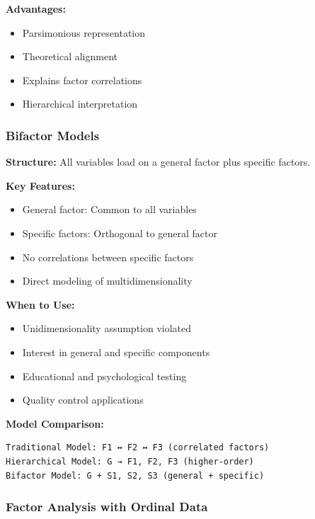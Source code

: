 \documentclass[
]{article}
\begin{document}
\textbf{Advantages:}

\begin{itemize}
\item
  Parsimonious representation
\item
  Theoretical alignment
\item
  Explains factor correlations
\item
  Hierarchical interpretation
\end{itemize}

\subsubsection{Bifactor Models}

\textbf{Structure:} All variables load on a general factor plus specific
factors.

\textbf{Key Features:}

\begin{itemize}
\item
  General factor: Common to all variables
\item
  Specific factors: Orthogonal to general factor
\item
  No correlations between specific factors
\item
  Direct modeling of multidimensionality
\end{itemize}

\textbf{When to Use:}

\begin{itemize}
\item
  Unidimensionality assumption violated
\item
  Interest in general and specific components
\item
  Educational and psychological testing
\item
  Quality control applications
\end{itemize}

\textbf{Model Comparison:}

\begin{verbatim}
Traditional Model: F1 ↔ F2 ↔ F3 (correlated factors)
Hierarchical Model: G → F1, F2, F3 (higher-order)
Bifactor Model: G + S1, S2, S3 (general + specific)
\end{verbatim}

\subsubsection{Factor Analysis with Ordinal Data}
\end{document}
